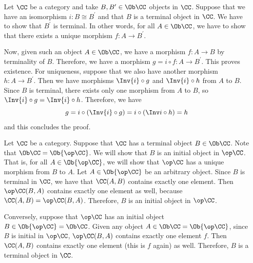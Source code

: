 \begin{solution}\label{sol:terminality_preserved_by_iso}
	Let $ \CC $ be a category and take $ B, B^\prime \in \Ob\CC $ objects in $ \CC $. Suppose that we have an isomorphism $ i: B \cong B^\prime $ and that $ B $ is a terminal object in $ \CC $. We have to show that $ B^\prime $ is terminal. In other words, for all $ A \in \Ob\CC $, we have to show that there exists a unique morphism $ f: A \to B^\prime $.

	Now, given such an object $ A \in \Ob\CC $, we have a morphism $ f: A \to B $ by terminality of $ B $. Therefore, we have a morphism $ g = i \circ f: A \to B^\prime $. This proves existence. For uniqueness, suppose that we also have another morphism $ h: A \to B^\prime $. Then we have morphisms $ \Inv{i} \circ g $ and $ \Inv{i} \circ h $ from $ A $ to $ B $. Since $ B $ is terminal, there exists only one morphism from $ A $ to $ B $, so $ \Inv{i} \circ g = \Inv{i} \circ h $. Therefore, we have 
	\[ g = i \circ (\Inv{i} \circ g) = i \circ (\Inv i \circ h) = h \]
	and this concludes the proof.
\end{solution}

\begin{solution}\label{sol:terminal_iff_initial_op}
  Let $ \CC $ be a category. Suppose that $ \CC $ has a terminal object $ B \in \Ob\CC $. Note that $ \Ob\CC = \Ob{\op\CC} $. We will show that $ B $ is an initial object in $ \op\CC $. That is, for all $ A \in \Ob{\op\CC} $, we will show that $ \op\CC $ has a unique morphism from $ B $ to $ A $.
  Let $ A \in \Ob{\op\CC} $ be an arbitrary object. Since $ B $ is terminal in $ \CC $, we have that $ \CC(A, B) $ contains exactly one element. Then $ \op\CC(B, A) $ contains exactly one element as well, because $ \CC(A, B) = \op\CC(B, A) $. Therefore, $ B $ is an initial object in $ \op\CC $.
  
  Conversely, suppose that $ \op\CC $ has an initial object $ B \in \Ob{\op\CC} = \Ob\CC $. Given any object $ A \in \Ob\CC = \Ob{\op\CC}  $, since $ B $ is initial in $ \op\CC $, $ \op\CC(B, A) $ contains exactly one element $ f $. Then $ \CC(A, B) $ contains exactly one element (this is $ f $ again) as well. Therefore, $ B $ is a terminal object in $ \CC $.
\end{solution}

